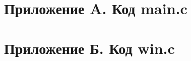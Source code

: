 \setcounter{secnumdepth}{-1}

\section{Приложение A. Код main.c}

\newpage

\section{Приложение Б. Код win.c}

\newpage
